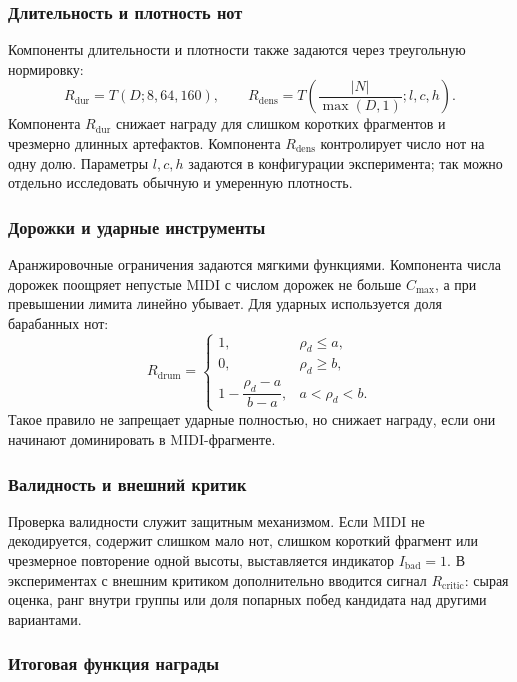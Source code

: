 \documentclass[a4paper,12pt]{extarticle}
\begin{document}
\subsubsection{Длительность и плотность нот}

Компоненты длительности и плотности также задаются через треугольную
нормировку:
\[
R_{\mathrm{dur}}=T(D;8,64,160), \qquad
R_{\mathrm{dens}}=T\!\left(\frac{|N|}{\max(D,1)};l,c,h\right).
\]
Компонента $R_{\mathrm{dur}}$ снижает награду для слишком коротких
фрагментов и чрезмерно длинных артефактов. Компонента
$R_{\mathrm{dens}}$ контролирует число нот на одну долю. Параметры
$l,c,h$ задаются в конфигурации эксперимента; так можно отдельно
исследовать обычную и умеренную плотность.

\subsubsection{Дорожки и ударные инструменты}

Аранжировочные ограничения задаются мягкими функциями. Компонента числа
дорожек поощряет непустые MIDI с числом дорожек не больше $C_{\max}$,
а при превышении лимита линейно убывает. Для ударных используется доля
барабанных нот:
\[
R_{\mathrm{drum}}=
\begin{cases}
1, & \rho_d\le a,\\
0, & \rho_d\ge b,\\
1-\dfrac{\rho_d-a}{b-a}, & a<\rho_d<b.
\end{cases}
\]
Такое правило не запрещает ударные полностью, но снижает награду, если
они начинают доминировать в MIDI-фрагменте.

\subsubsection{Валидность и внешний критик}

Проверка валидности служит защитным механизмом. Если MIDI не
декодируется, содержит слишком мало нот, слишком короткий фрагмент или
чрезмерное повторение одной высоты, выставляется индикатор
$I_{\mathrm{bad}}=1$. В экспериментах с внешним критиком дополнительно
вводится сигнал $R_{\mathrm{critic}}$: сырая оценка, ранг внутри
группы или доля попарных побед кандидата над другими вариантами.

\subsubsection{Итоговая функция награды}
\end{document}
